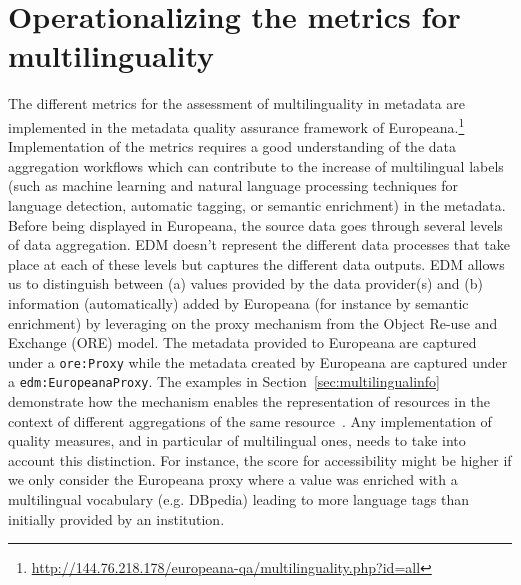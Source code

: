 \section{Operationalizing the metrics for multilinguality}
The different metrics for the assessment of multilinguality in metadata are implemented in the metadata quality assurance framework of Europeana.\footnote{ \url{http://144.76.218.178/europeana-qa/multilinguality.php?id=all}}
Implementation of the metrics requires a good understanding of the data aggregation workflows which can contribute to the increase of multilingual labels (such as machine learning and natural language processing techniques for language detection, automatic tagging, or semantic enrichment) in the metadata. Before being displayed in Europeana, the source data goes through several levels of data aggregation. EDM doesn't represent the different data processes that take place at each of these levels but captures the different data outputs. EDM allows us to distinguish between (a) values provided by the data provider(s) and (b) information (automatically) added by Europeana (for instance by semantic enrichment) by leveraging on the proxy mechanism from the Object Re-use and Exchange (ORE) model. The metadata provided to Europeana are captured under a \texttt {ore:Proxy} while the metadata created by Europeana are captured under a \texttt{edm:EuropeanaProxy}. The examples in Section~\ref{sec:multilingualinfo} demonstrate how the mechanism enables the representation of resources in the context of different aggregations of the same resource~\cite{isaac2013}. Any implementation of quality measures, and in particular of multilingual ones, needs to take into account this distinction. For instance, the score for accessibility might be higher if we only consider the Europeana proxy where a value was enriched with a multilingual vocabulary (e.g. DBpedia) leading to more language tags than initially provided by an institution. 

